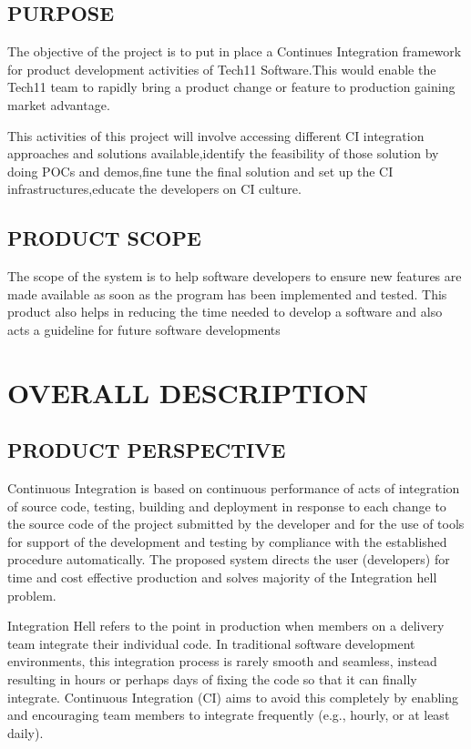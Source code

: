 \documentclass[12pt,a4paper,oneside]{report}
\begin{document}
{\section{PURPOSE}
\par The objective of the project is to put in place a Continues Integration framework for product
development activities of Tech11 Software.This would enable the Tech11 team to rapidly bring a
product change or feature to production gaining market advantage.
\par
This activities of this project will involve accessing different CI integration approaches and
solutions available,identify the feasibility of those solution by doing POCs and demos,fine tune the
final solution and set up the CI infrastructures,educate the developers on CI culture.

\section{PRODUCT SCOPE}
\par  The scope of the system is to help software developers to ensure new features are made available as soon as the program has been
implemented and tested. This product also helps in reducing the time needed to develop a software and also acts a guideline for future software developments
\\

\chapter{OVERALL DESCRIPTION}
\section{PRODUCT PERSPECTIVE}
\par
Continuous Integration is based on continuous performance of acts of integration of
source code, testing, building and deployment in response to each change to the source code of
the project submitted by the developer and for the use of tools for support of the development
and testing by compliance with the established procedure automatically. The proposed system
directs the user (developers) for time and cost effective production and solves majority of the
Integration hell problem. \par
Integration Hell refers to the point in production when members on a delivery team integrate
their individual code. In traditional software development environments, this integration
process is rarely smooth and seamless, instead resulting in hours or perhaps days of fixing the
code so that it can finally integrate. Continuous Integration (CI) aims to avoid this completely
by enabling and encouraging team members to integrate frequently (e.g., hourly, or at least
daily).

}
\end{document}
